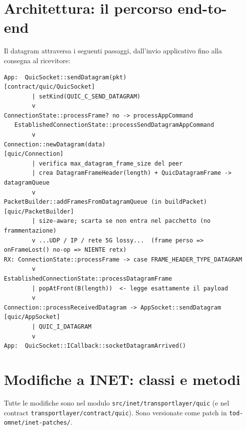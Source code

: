\documentclass[11pt,a4paper]{article}
\newcommand{\code}[1]{\texttt{#1}}
\begin{document}
\section{Architettura: il percorso end-to-end}
Il datagram attraversa i seguenti passaggi, dall'invio applicativo fino alla consegna al ricevitore:

\begin{lstlisting}[style=sh]
App:  QuicSocket::sendDatagram(pkt)                     [contract/quic/QuicSocket]
        | setKind(QUIC_C_SEND_DATAGRAM)
        v
ConnectionState::processFrame? no -> processAppCommand
   EstablishedConnectionState::processSendDatagramAppCommand
        v
Connection::newDatagram(data)                           [quic/Connection]
        | verifica max_datagram_frame_size del peer
        | crea DatagramFrameHeader(length) + QuicDatagramFrame -> datagramQueue
        v
PacketBuilder::addFramesFromDatagramQueue (in buildPacket)   [quic/PacketBuilder]
        | size-aware; scarta se non entra nel pacchetto (no frammentazione)
        v ...UDP / IP / rete 5G lossy...  (frame perso => onFrameLost() no-op => NIENTE retx)
RX: ConnectionState::processFrame -> case FRAME_HEADER_TYPE_DATAGRAM
        v
EstablishedConnectionState::processDatagramFrame
        | popAtFront(B(length))  <- legge esattamente il payload
        v
Connection::processReceivedDatagram -> AppSocket::sendDatagram   [quic/AppSocket]
        | QUIC_I_DATAGRAM
        v
App:  QuicSocket::ICallback::socketDatagramArrived()
\end{lstlisting}

\section{Modifiche a INET: classi e metodi}
Tutte le modifiche sono nel modulo \code{src/inet/transportlayer/quic} (e nel contract
\code{transportlayer/contract/quic}). Sono versionate come patch in \code{tod-omnet/inet-patches/}.
\end{document}
